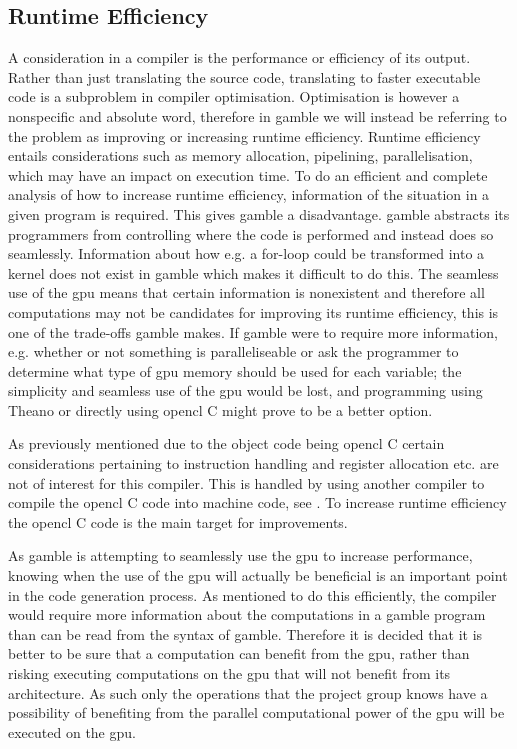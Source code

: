 \subsection*{Runtime Efficiency}\label{subsec:runtime}
A consideration in a compiler is the performance or efficiency of its output. 
Rather than just translating the source code, translating to faster executable code is a subproblem in compiler optimisation.
Optimisation is however a nonspecific and absolute word, therefore in \gls{gamble} we will instead be referring to the problem as improving or increasing runtime efficiency.
Runtime efficiency entails considerations such as memory allocation, pipelining, parallelisation, which may have an impact on execution time.
To do an efficient and complete analysis of how to increase runtime efficiency, information of the situation in a given program is required.
This gives \gls{gamble} a disadvantage. 
\gls{gamble} abstracts its programmers from controlling where the code is performed and instead does so seamlessly.
Information about how e.g. a for-loop could be transformed into a kernel does not exist in \gls{gamble} which makes it difficult to do this.
The seamless use of the \acrshort{gpu} means that certain information is nonexistent and therefore all computations may not be candidates for improving its runtime efficiency, this is one of the trade-offs \gls{gamble} makes.
If \gls{gamble} were to require more information, e.g. whether or not something is paralleliseable or ask the programmer to determine what type of \acrshort{gpu} memory should be used for each variable; the simplicity and seamless use of the \acrshort{gpu} would be lost, and programming using Theano or directly using \gls{opencl} C might prove to be a better option.

As previously mentioned due to the object code being \gls{opencl} C certain considerations pertaining to instruction handling and register allocation etc. are not of interest for this compiler.
This is handled by using another compiler to compile the \gls{opencl} C code into machine code, see . 
To increase runtime efficiency the \gls{opencl} C code is the main target for improvements.

As \gls{gamble} is attempting to seamlessly use the \acrshort{gpu} to increase performance, knowing when the use of the \acrshort{gpu} will actually be beneficial is an important point in the code generation process. 
As mentioned to do this efficiently, the compiler would require more information about the computations in a \gls{gamble} program than can be read from the syntax of \gls{gamble}.
Therefore it is decided that it is better to be sure that a computation can benefit from the \acrshort{gpu}, rather than risking executing computations on the \acrshort{gpu} that will not benefit from its architecture.
As such only the operations that the project group knows have a possibility of benefiting from the parallel computational power of the \acrshort{gpu} will be executed on the \acrshort{gpu}.

